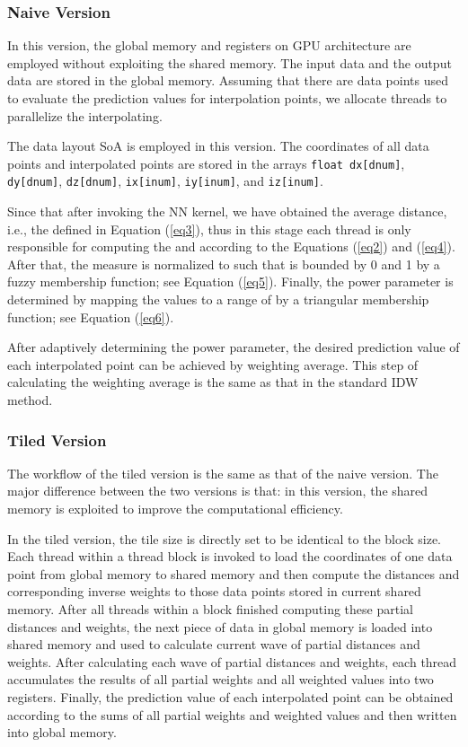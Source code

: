 \documentclass[final,5p,times,twocolumn,authoryear]{elsarticle}
\begin{document}
			\subsubsection{Naive Version}
			
			In this version, the global memory and registers on GPU architecture are 
			employed without exploiting the shared memory. The input data and the output 
			data are stored in the global memory. Assuming that there are  data points 
			used to evaluate the prediction values for  interpolation points, we 
			allocate  threads to parallelize the interpolating. 
			
			The data layout SoA is employed in this version. The coordinates of all data 
			points and interpolated points are stored in the arrays \texttt{float dx[dnum]}, \texttt{dy[dnum]}, \texttt{dz[dnum]}, \texttt{ix[inum]}, \texttt{iy[inum]}, and \texttt{iz[inum]}. 
			
			Since that after invoking the NN kernel, we have obtained the average 
			distance, i.e., the  defined in Equation (\ref{eq3}), thus in this stage 
			each thread is only responsible for computing the  and  according to the Equations (\ref{eq2}) and (\ref{eq4}). After that, the 
			 measure is normalized to  such that  is bounded by 0 and 1 by a fuzzy membership function; see Equation (\ref{eq5}). 
			Finally, the power parameter  is determined by mapping the  values to a range of  by a triangular membership 
			function; see Equation (\ref{eq6}).
			
			After adaptively determining the power parameter, the desired prediction 
			value of each interpolated point can be achieved by weighting average. This 
			step of calculating the weighting average is the same as that in the 
			standard IDW method.
			
			\subsubsection{Tiled Version}
			
			The workflow of the tiled version is the same as that of the naive version. 
			The major difference between the two versions is that: in this version, the 
			shared memory is exploited to improve the computational efficiency. 
			
			In the tiled version, the tile size is directly set to be identical to the 
			block size. Each thread within a thread block is invoked to load the 
			coordinates of one data point from global memory to shared memory and then 
			compute the distances and corresponding inverse weights to those data points 
			stored in current shared memory. After all threads within a block finished 
			computing these partial distances and weights, the next piece of data in 
			global memory is loaded into shared memory and used to calculate current 
			wave of partial distances and weights. After calculating each wave of 
			partial distances and weights, each thread accumulates the results of all 
			partial weights and all weighted values into two registers. Finally, the 
			prediction value of each interpolated point can be obtained according to the 
			sums of all partial weights and weighted values and then written into global 
			memory.
			
\end{document}
